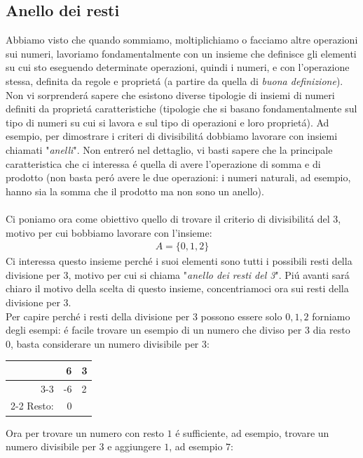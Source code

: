 \documentclass[twoside]{article} %
\begin{document}
	 \subsection{Anello dei resti}
	 Abbiamo visto che quando sommiamo, moltiplichiamo o facciamo altre operazioni sui numeri, lavoriamo fondamentalmente con un insieme che definisce gli elementi su cui sto eseguendo determinate operazioni, quindi i numeri, e con l'operazione stessa, definita da regole e propriet\'a (a partire da quella di \textit{buona definizione}).\\
	 Non vi sorprender\'a sapere che esistono diverse tipologie di insiemi di numeri definiti da propriet\'a caratteristiche (tipologie che si basano fondamentalmente sul tipo di numeri su cui si lavora e sul tipo di operazioni e loro propriet\'a). Ad esempio, per dimostrare i criteri di divisibilit\'a dobbiamo lavorare con insiemi chiamati "\textit{anelli}". Non entrer\'o nel dettaglio, vi basti sapere che la principale caratteristica che ci interessa \'e quella di avere l'operazione di somma e di prodotto (non basta per\'o avere le due operazioni: i numeri naturali, ad esempio, hanno sia la somma che il prodotto ma non sono un anello).\\ \\
	 Ci poniamo ora come obiettivo quello di trovare il criterio di divisibilit\'a del 3, motivo per cui bobbiamo lavorare con l'insieme:
	 \begin{gather*}
	 	A=\{0,1,2\}
	 \end{gather*}
	Ci interessa questo insieme perch\'e i suoi elementi sono tutti i possibili resti della divisione per 3, motivo per cui si chiama "\textit{anello dei resti del 3}". Pi\'u avanti sar\'a chiaro il motivo della scelta di questo insieme, concentriamoci ora sui resti della divisione per 3. \\
	Per capire perch\'e i resti della divisione per 3 possono essere solo $0, 1, 2$ forniamo degli esempi: \'e facile trovare un esempio di un numero che diviso per $3$ dia resto 0, basta considerare un numero divisibile per 3:
	\begin{center}	
		\begin{tabular}{rr|l}
			&6&3\\\cline{3-3}
			&-6&2\\\cline{2-2}
			Resto:&0&
		\end{tabular}
	\end{center}
	Ora per trovare un numero con resto $1$ \'e sufficiente, ad esempio, trovare un numero divisibile per $3$ e aggiungere $1$, ad esempio $7$:
\end{document}
